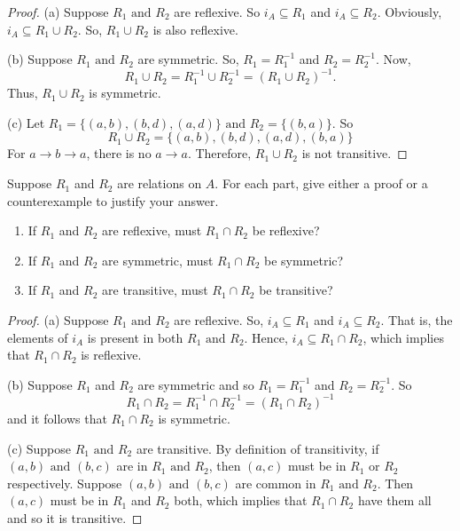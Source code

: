 \documentclass[12pt]{article}
\newenvironment{exercise}[2][Exercise]{\begin{trivlist}
\item[\hskip \labelsep {\bfseries #1}\hskip \labelsep {\bfseries #2.}]}{\end{trivlist}}
\newcommand{\ro}{\text { or }}
\newcommand{\nd}{\text{ and }}
\begin{document}
\begin{proof}
	(a) Suppose $R_1 \nd R_2$ are reflexive. So $i_{A} \subseteq R_1$ and $i_{A} \subseteq R_2$. Obviously, $i_{A} \subseteq R_1\cup R_2$. So, $R_1\cup R_2$ is also reflexive.
	
	(b) Suppose $R_1 \nd R_2$ are symmetric. So, $R_1=R_1^{-1}$ and $R_2=R_2^{-1} $. Now,
	\[
		R_1\cup R_2=R_1^{-1} \cup R_2^{-1} =(R_1\cup R_2)^{-1}.
	\]
	Thus, $R_1\cup R_2$ is symmetric.
	
	(c) Let $R_1=\{(a,b),(b,d),(a,d)\} \nd R_2=\{(b,a)\}$. So
	\[
		R_1\cup R_2=\{(a,b),(b,d),(a,d),(b,a)\}
	\]
	For $a\to b\to a$, there is no $a\to a$. Therefore, $R_1\cup R_2$ is not transitive.  
\end{proof}

\begin{exercise}
	{14}
	Suppose \( R_1 \) and \( R_2 \) are relations on \( A \). For each part, give either a proof or a counterexample to justify your answer.
	\begin{enumerate}
		\item[(a)] If \( R_1 \) and \( R_2 \) are reflexive, must \( R_1 \cap R_2 \) be reflexive?
		\item[(b)] If \( R_1 \) and \( R_2 \) are symmetric, must \( R_1 \cap R_2 \) be symmetric?
		\item[(c)] If \( R_1 \) and \( R_2 \) are transitive, must \( R_1 \cap R_2 \) be transitive?
	\end{enumerate}
\end{exercise}

\begin{proof}
	(a) Suppose $R_1 \nd R_2$ are reflexive. So, $i_{A} \subseteq R_1$ and $i_{A} \subseteq R_2$. That is, the elements of $i_{A} $ is present in both $R_1 \nd R_2$. Hence, $i_{A} \subseteq R_1\cap R_2$, which implies that $R_1\cap R_2$ is reflexive.
	
	(b) Suppose $R_1$ and $R_2$ are symmetric and so $R_1=R_1^{-1} $ and $R_2=R_2^{-1} $. So
	\[
		R_1\cap R_2=R_1^{-1} \cap R_2^{-1} =(R_1\cap R_2)^{-1} 
	\]
	and it follows that $R_1\cap R_2$ is symmetric.
	
	(c) Suppose $R_1 \nd R_2$ are transitive. By definition of transitivity, if $(a,b) \nd (b,c)$ are in $R_1 \nd R_2$, then $(a,c)$ must be in $R_1 \ro R_2$ respectively. Suppose $(a,b) \nd (b,c)$ are common in $R_1 \nd R_2$. Then $(a,c)$ must be in $R_1$ and $R_2$ both, which implies that $R_1\cap  R_2$ have them all and so it is transitive.           
\end{proof}
\end{document}
